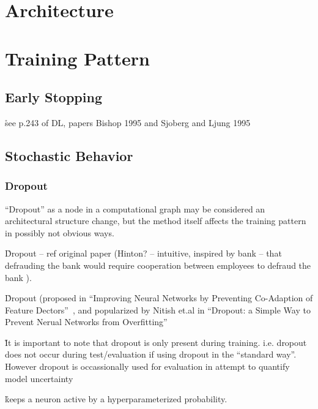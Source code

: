\section{Architecture}

\section{Training Pattern}

\subsection{Early Stopping}

\r{see p.243 of DL, papers Bishop 1995 and Sjoberg and Ljung 1995}



\subsection{Stochastic Behavior}

\subsubsection{Dropout}

\r{``Dropout'' as a node in a computational graph may be considered an architectural structure change, but the method itself affects the training pattern in possibly not obvious ways. }


\r{Dropout -- ref original paper (Hinton? -- intuitive, inspired by bank -- that defrauding the bank would require cooperation between employees to defraud the bank )}.

\r{Dropout (proposed in ``Improving Neural Networks by Preventing Co-Adaption of Feature Dectors''~\cite{DBLP:journals/corr/abs-1207-0580}, and popularized by Nitish et.al in ``Dropout: a Simple Way to Prevent Nerual Networks from Overfitting''~\cite{JMLR:v15:srivastava14a}}

\r{It is important to note that dropout is only present during training. i.e. dropout does not occur during test/evaluation if using dropout in the ``standard way''. However dropout is occassionally used for evaluation in attempt to quantify model uncertainty }

\r{keeps a neuron active by a hyperparameterized probability.}

